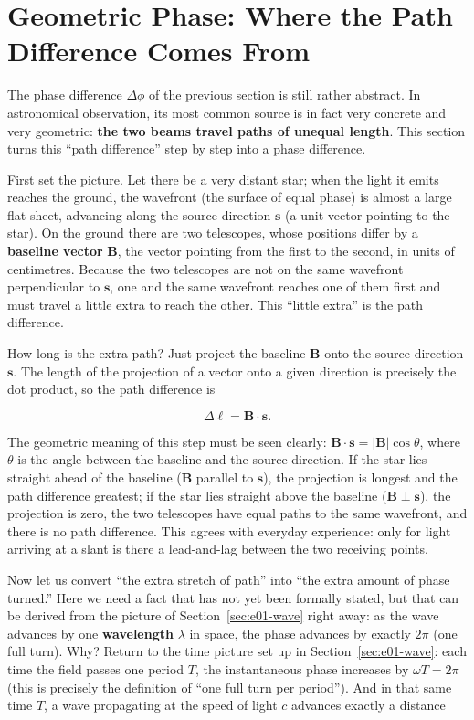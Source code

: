 \section{Geometric Phase: Where the Path Difference Comes From}
\label{sec:e01-geometry}

The phase difference \(\Delta\phi\) of the previous section is still rather abstract. In astronomical observation, its most common source is in fact very concrete and very geometric: \textbf{the two beams travel paths of unequal length}. This section turns this ``path difference'' step by step into a phase difference.

First set the picture. Let there be a very distant star; when the light it emits reaches the ground, the wavefront (the surface of equal phase) is almost a large flat sheet, advancing along the source direction \(\bm s\) (a unit vector pointing to the star). On the ground there are two telescopes, whose positions differ by a \textbf{baseline vector} \(\bm B\), the vector pointing from the first to the second, in units of centimetres. Because the two telescopes are not on the same wavefront perpendicular to \(\bm s\), one and the same wavefront reaches one of them first and must travel a little extra to reach the other. This ``little extra'' is the path difference.

How long is the extra path? Just project the baseline \(\bm B\) onto the source direction \(\bm s\). The length of the projection of a vector onto a given direction is precisely the dot product, so the path difference is

\[
  \Delta \ell=\bm B\cdot\bm s .
\]

The geometric meaning of this step must be seen clearly: \(\bm B\cdot\bm s=|\bm B|\cos\theta\), where \(\theta\) is the angle between the baseline and the source direction. If the star lies straight ahead of the baseline (\(\bm B\) parallel to \(\bm s\)), the projection is longest and the path difference greatest; if the star lies straight above the baseline (\(\bm B\perp\bm s\)), the projection is zero, the two telescopes have equal paths to the same wavefront, and there is no path difference. This agrees with everyday experience: only for light arriving at a slant is there a lead-and-lag between the two receiving points.

Now let us convert ``the extra stretch of path'' into ``the extra amount of phase turned.'' Here we need a fact that has not yet been formally stated, but that can be derived from the picture of Section~\ref{sec:e01-wave} right away: as the wave advances by one \textbf{wavelength} \(\lambda\) in space, the phase advances by exactly \(2\pi\) (one full turn). Why? Return to the time picture set up in Section~\ref{sec:e01-wave}: each time the field passes one period \(T\), the instantaneous phase increases by \(\omega T=2\pi\) (this is precisely the definition of ``one full turn per period''). And in that same time \(T\), a wave propagating at the speed of light \(c\) advances exactly a distance

